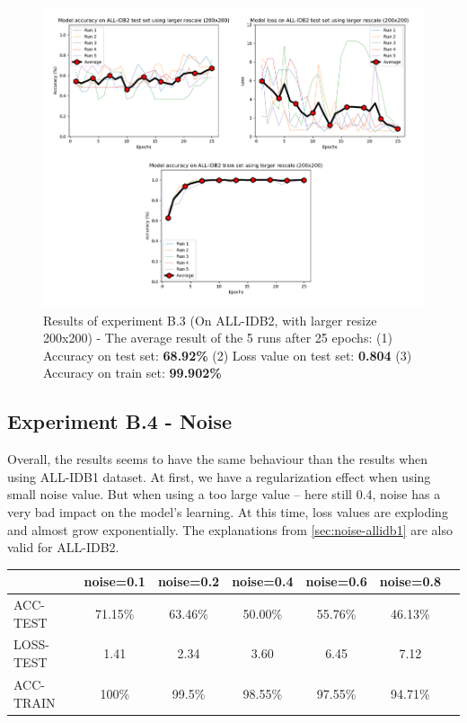 \documentclass[11pt, openany]{report}
\theoremstyle{plain}
\theoremstyle{definition}
\theoremstyle{remark}
\begin{document}
\begin{figure}[H]
  \centering
  \includegraphics[scale=0.45]{Code/ch6-LeukemiaSubtypes/figures_result/ALL_IDB2/all_idb2-200x200.PNG}
  \caption{Results of experiment B.3 (On ALL-IDB2, with larger resize 200x200) - The average result of the 5 runs after 25 epochs: (1) Accuracy on test set: \textbf{68.92\%} (2) Loss value on test set: \textbf{0.804} (3) Accuracy on train set: \textbf{99.902\%}}
  \label{fig:results-B3}
\end{figure}



\subsection{Experiment B.4 - Noise}
Overall, the results seems to have the same behaviour than the results when using ALL-IDB1 dataset. At first, we have a regularization effect when using small noise value. But when using a too large value -- here still 0.4, noise has a very bad impact on the model's learning. At this time, loss values are exploding and almost grow exponentially. The explanations from \autoref{sec:noise-allidb1} are also valid for ALL-IDB2.

\begin{center}
\begin{tabular}{|l|c|c|c|c|c|c|}
  \hline
   & \textbf{noise=0.1} & \textbf{noise=0.2} & \textbf{noise=0.4} & \textbf{noise=0.6} & \textbf{noise=0.8}\\
  \hline
  ACC-TEST & 71.15\% & 63.46\% & 50.00\% & 55.76\% & 46.13\%\\
  LOSS-TEST & 1.41 & 2.34 & 3.60 & 6.45  & 7.12\\ 
  ACC-TRAIN & 100\% & 99.5\% & 98.55\% & 97.55\% & 94.71\% \\ 
  \hline
\end{tabular}
\label{table:results-B4}
\end{center}
\end{document}
